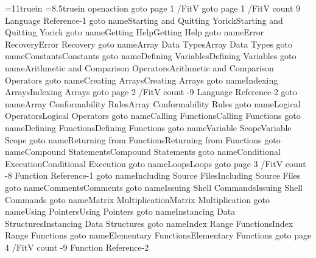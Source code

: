\newif\ifpdf
\ifx\pdfoutput\undefined
  \pdffalse
  \def\mysection#1{\par\filbreak
    \vskip 3ex plus 2ex minus 2ex {\headingfont #1}\mark{#1}%
    \vskip 2ex plus 1ex minus 1.5ex}
\else
  \pdftrue
  \pdfpagewidth=11truein
  \pdfpageheight=8.5truein
  \outer\def\mysection#1{\par\filbreak
    \vskip 3ex plus 2ex minus 2ex\hskip -2em \pdfdest name{#1} xyz \hskip 2em {\headingfont #1}\mark{#1}%
    \vskip 2ex plus 1ex minus 1.5ex}
   openaction goto page 1 {/FitV}
  \pdfoutline goto page 1 {/FitV} count 9 {Language Reference-1}
    \pdfoutline goto name{Starting and Quitting Yorick}{Starting and Quitting Yorick}
    \pdfoutline goto name{Getting Help}{Getting Help}
    \pdfoutline goto name{Error Recovery}{Error Recovery}
    \pdfoutline goto name{Array Data Types}{Array Data Types}
    \pdfoutline goto name{Constants}{Constants}
    \pdfoutline goto name{Defining Variables}{Defining Variables}
    \pdfoutline goto name{Arithmetic and Comparison Operators}{Arithmetic and Comparison Operators}
    \pdfoutline goto name{Creating Arrays}{Creating Arrays}
    \pdfoutline goto name{Indexing Arrays}{Indexing Arrays}
  \pdfoutline goto page 2 {/FitV} count -9 {Language Reference-2}
    \pdfoutline goto name{Array Conformability Rules}{Array Conformability Rules}
    \pdfoutline goto name{Logical Operators}{Logical Operators}
    \pdfoutline goto name{Calling Functions}{Calling Functions}
    \pdfoutline goto name{Defining Functions}{Defining Functions}
    \pdfoutline goto name{Variable Scope}{Variable Scope}
    \pdfoutline goto name{Returning from Functions}{Returning from Functions}
    \pdfoutline goto name{Compound Statements}{Compound Statements}
    \pdfoutline goto name{Conditional Execution}{Conditional Execution}
    \pdfoutline goto name{Loops}{Loops}
  \pdfoutline goto page 3 {/FitV} count -8 {Function Reference-1}
    \pdfoutline goto name{Including Source Files}{Including Source Files}
    \pdfoutline goto name{Comments}{Comments}
    \pdfoutline goto name{Issuing Shell Commands}{Issuing Shell Commands}
    \pdfoutline goto name{Matrix Multiplication}{Matrix Multiplication}
    \pdfoutline goto name{Using Pointers}{Using Pointers}
    \pdfoutline goto name{Instancing Data Structures}{Instancing Data Structures}
    \pdfoutline goto name{Index Range Functions}{Index Range Functions}
    \pdfoutline goto name{Elementary Functions}{Elementary Functions}
  \pdfoutline goto page 4 {/FitV} count -9 {Function Reference-2}
